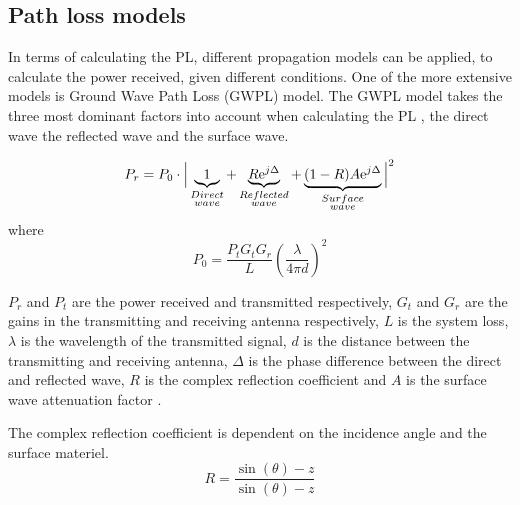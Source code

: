 \subsection{Path loss models}

In terms of calculating the PL, different propagation models can be applied, to calculate the power received, given different conditions. One of the more extensive models is Ground Wave Path Loss (GWPL) model. The GWPL model takes the three most dominant factors into account when calculating the PL \cite{Chong,Bullington}, the direct wave the reflected wave and the surface wave.  


\begin{equation}
P_r=P_0 \cdot \Big|\underbrace{1}_{\begin{subarray}{c}Direct\\wave\end{subarray}}+\underbrace{R\text{e}^{j\Delta}}_{\begin{subarray}{c}Reflected\\wave\end{subarray}}+\underbrace{(1-R)A\text{e}^{j\Delta}}_{\begin{subarray}{c}Surface\\wave\end{subarray}}\Big|^2 
\label{ground_wave}
\end{equation}
where
\begin{equation}
P_0 = \frac{P_t G_t G_r}{L} \left(\frac{\lambda}{4 \pi d}\right)^2 
\label{ground_wave_P0}
\end{equation}

$P_{r}$ and $P_{t}$ are the power received and transmitted respectively, $G_t$ and $G_r$ are the gains in the transmitting and receiving antenna respectively, $L$ is the system loss, $\lambda$ is the wavelength of the transmitted signal, $d$ is the distance between the transmitting and receiving antenna, $\Delta$ is the phase difference between the direct and reflected wave, $R$ is the complex reflection coefficient and $A$ is the surface wave attenuation factor \cite{Chong,Bullington}. 


The complex reflection coefficient is dependent on the incidence angle and the surface materiel.
\begin{equation}
R = \frac{\sin(\theta)-z}{\sin(\theta)-z}
\label{reflection_coefficient}
\end{equation}

